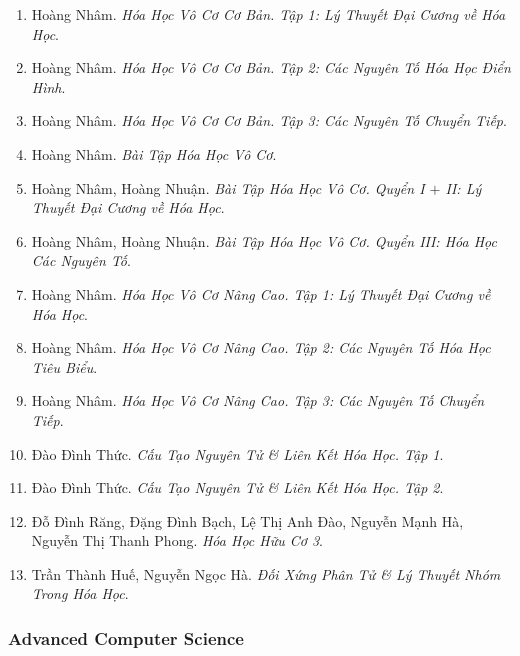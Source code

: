 \documentclass{article}
\begin{document}
\begin{enumerate}
	\item Hoàng Nhâm. {\it Hóa Học Vô Cơ Cơ Bản. Tập 1: Lý Thuyết Đại Cương về Hóa Học}.

	\item Hoàng Nhâm. {\it Hóa Học Vô Cơ Cơ Bản. Tập 2: Các Nguyên Tố Hóa Học Điển Hình}.

	\item Hoàng Nhâm. {\it Hóa Học Vô Cơ Cơ Bản. Tập 3: Các Nguyên Tố Chuyển Tiếp}.

	\item Hoàng Nhâm. {\it Bài Tập Hóa Học Vô Cơ}.

	\item Hoàng Nhâm, Hoàng Nhuận. {\it Bài Tập Hóa Học Vô Cơ. Quyển I $+$ II: Lý Thuyết Đại Cương về Hóa Học}.

	\item Hoàng Nhâm, Hoàng Nhuận. {\it Bài Tập Hóa Học Vô Cơ. Quyển III: Hóa Học Các Nguyên Tố}.

	\item Hoàng Nhâm. {\it Hóa Học Vô Cơ Nâng Cao. Tập 1: Lý Thuyết Đại Cương về Hóa Học}.

	\item Hoàng Nhâm. {\it Hóa Học Vô Cơ Nâng Cao. Tập 2: Các Nguyên Tố Hóa Học Tiêu Biểu}.

	\item Hoàng Nhâm. {\it Hóa Học Vô Cơ Nâng Cao. Tập 3: Các Nguyên Tố Chuyển Tiếp}.

	\item Đào Đình Thức. {\it Cấu Tạo Nguyên Tử \& Liên Kết Hóa Học. Tập 1}.

	\item Đào Đình Thức. {\it Cấu Tạo Nguyên Tử \& Liên Kết Hóa Học. Tập 2}.

	\item Đỗ Đình Răng, Đặng Đình Bạch, Lệ Thị Anh Đào, Nguyễn Mạnh Hà, Nguyễn Thị Thanh Phong. {\it Hóa Học Hữu Cơ 3}.

	\item Trần Thành Huế, Nguyễn Ngọc Hà. {\it Đối Xứng Phân Tử \& Lý Thuyết Nhóm Trong Hóa Học}.
\end{enumerate}


\subsubsection{Advanced Computer Science}
\end{document}
